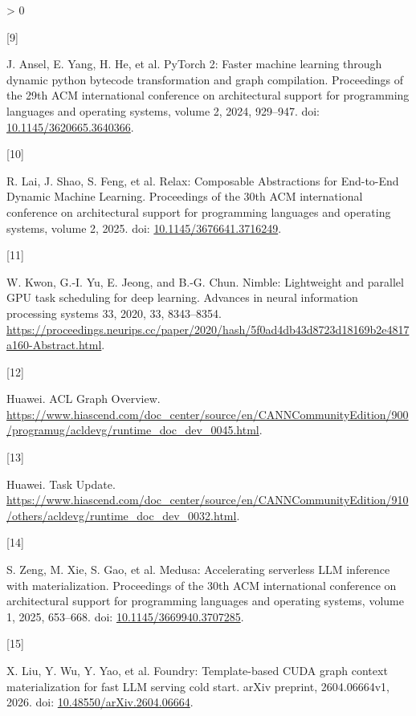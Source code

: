 \documentclass[
  11pt,
  UTF8]{ctexart}
\newlength{\cslhangindent}
\newlength{\csllabelwidth}
\newenvironment{CSLReferences}[2] %
 {%
  \setlength{\parindent}{0pt}
  \ifodd #1 \everypar{\setlength{\hangindent}{\cslhangindent}}\ignorespaces\fi
  \ifnum #2 > 0
  \setlength{\parskip}{#2\baselineskip}
  \fi
 }%
 {}
\newcommand{\CSLLeftMargin}[1]{\parbox[t]{\csllabelwidth}{#1}}
\newcommand{\CSLRightInline}[1]{\parbox[t]{\linewidth - \csllabelwidth}{#1}\break}
\begin{document}
\begin{CSLReferences}{0}{0}
\leavevmode{}%
\CSLLeftMargin{{[}9{]} }
\CSLRightInline{J. Ansel, E. Yang, H. He, et al. PyTorch 2: Faster
machine learning through dynamic python bytecode transformation and
graph compilation. Proceedings of the 29th ACM international conference
on architectural support for programming languages and operating
systems, volume 2, 2024, 929--947. doi:
\href{https://doi.org/10.1145/3620665.3640366}{10.1145/3620665.3640366}.}

\leavevmode{}%
\CSLLeftMargin{{[}10{]} }
\CSLRightInline{R. Lai, J. Shao, S. Feng, et al. {Relax: Composable
Abstractions for End-to-End Dynamic Machine Learning}. Proceedings of
the 30th ACM international conference on architectural support for
programming languages and operating systems, volume 2, 2025. doi:
\href{https://doi.org/10.1145/3676641.3716249}{10.1145/3676641.3716249}.}

\leavevmode{}%
\CSLLeftMargin{{[}11{]} }
\CSLRightInline{W. Kwon, G.-I. Yu, E. Jeong, and B.-G. Chun. Nimble:
Lightweight and parallel GPU task scheduling for deep learning. Advances
in neural information processing systems 33, 2020, 33, 8343--8354.
\url{https://proceedings.neurips.cc/paper/2020/hash/5f0ad4db43d8723d18169b2e4817a160-Abstract.html}.}

\leavevmode{}%
\CSLLeftMargin{{[}12{]} }
\CSLRightInline{Huawei. {ACL Graph Overview}.
\url{https://www.hiascend.com/doc_center/source/en/CANNCommunityEdition/900/programug/acldevg/runtime_doc_dev_0045.html}.}

\leavevmode{}%
\CSLLeftMargin{{[}13{]} }
\CSLRightInline{Huawei. {Task Update}.
\url{https://www.hiascend.com/doc_center/source/en/CANNCommunityEdition/910/others/acldevg/runtime_doc_dev_0032.html}.}

\leavevmode{}%
\CSLLeftMargin{{[}14{]} }
\CSLRightInline{S. Zeng, M. Xie, S. Gao, et al. Medusa: Accelerating
serverless LLM inference with materialization. Proceedings of the 30th
ACM international conference on architectural support for programming
languages and operating systems, volume 1, 2025, 653--668. doi:
\href{https://doi.org/10.1145/3669940.3707285}{10.1145/3669940.3707285}.}

\leavevmode{}%
\CSLLeftMargin{{[}15{]} }
\CSLRightInline{X. Liu, Y. Wu, Y. Yao, et al. Foundry: Template-based
CUDA graph context materialization for fast LLM serving cold start.
arXiv preprint, 2604.06664v1, 2026. doi:
\href{https://doi.org/10.48550/arXiv.2604.06664}{10.48550/arXiv.2604.06664}.}


\end{CSLReferences}
\end{document}
